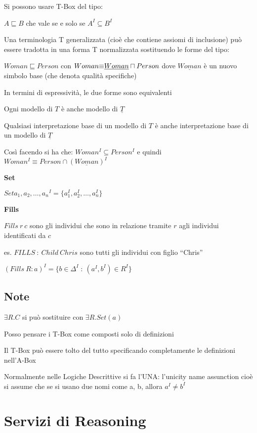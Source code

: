 Si possono usare T-Box del tipo:

$A\sqsubseteq B$ che vale se e solo se $A^{I}\subseteq B^{I}$

Una terminologia T generalizzata (cioè che contiene assiomi di inclusione)
può essere tradotta in una forma T normalizzata sostituendo le forme
del tipo:

$Woman\sqsubseteq Person$ con $Woman\mbox{\ensuremath{\equiv}}\underline{Woman}\sqcap Person$
dove $\underline{Woman}$ è un nuovo simbolo base (che denota qualità
specifiche)

In termini di espressività, le due forme sono equivalenti

Ogni modello di $T$ è anche modello di $\underline{T}$

Qualsiasi interpretazione base di un modello di $T$ è anche interpretazione
base di un modello di $\underline{T}$

Così facendo si ha che: $Woman^{I}\subseteq Person^{I}$ e quindi
$Woman^{I}\equiv Person\cap(\underline{Woman})^{I}$

\textbf{Set}

$Set{a_{1},a_{2},\dots,a_{n}}^{I}=\{a_{1}^{I},a_{2}^{I},\dots,a_{n}^{I}\}$

\textbf{Fills}

$Fills\ r\ c$ sono gli individui che sono in relazione tramite $r$
agli individui identificati da $c$

es. $FILLS\ :\ Child\ Chris$ sono tutti gli individui con figlio
``Chris''

$(Fills\ R:a)^{I}=\{b\in\Delta^{I}\;:\ (a^{I},b^{I})\in R^{I}\}$


\subsection{Note}

$\exists R.C$ si può sostituire con $\exists R.Set(a)$

Posso pensare i T-Box come composti solo di definizioni

Il T-Box può essere tolto del tutto specificando completamente le
definizioni nell'A-Box

Normalmente nelle Logiche Descrittive si fa l'UNA: l'unicity name
assunction cioè si assume che se si usano due nomi come a, b, allora
$a^{I}\neq b^{I}$


\section{Servizi di Reasoning}

